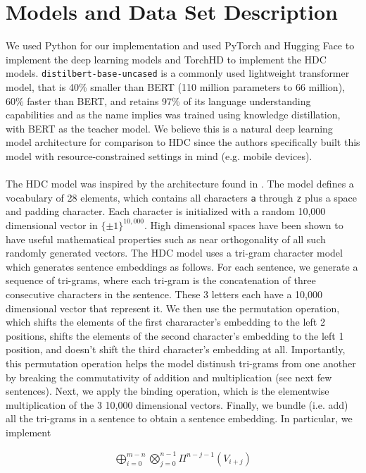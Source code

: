 \documentclass[conference]{IEEEtran}
\begin{document}
\section{Models and Data Set Description}
\label{sec:models}
We used Python for our implementation and used PyTorch and Hugging Face \cite{HF} to implement the deep learning models and TorchHD \cite{torchhd} to implement the HDC models. \verb|distilbert-base-uncased| is a commonly used lightweight transformer model, that is 40\% smaller than BERT (110 million parameters to  66 million), 60\% faster than BERT, and retains 97\% of its language understanding capabilities \cite{sanh2020distilbert} and as the name implies was trained using knowledge distillation, with BERT as the teacher model. We believe this is a natural deep learning model architecture for comparison to HDC since the authors specifically built this model with resource-constrained settings in mind (e.g. mobile devices).\\
\\
The HDC model was inspired by the architecture found in \cite{HDC}. The model defines a vocabulary of 28 elements, which contains all characters \verb|a| through \verb|z| plus a space and padding character. Each character is initialized with a random 10,000 dimensional vector in $\{\pm 1\}^{10,000}$. High dimensional spaces have been shown to have useful mathematical properties such as near orthogonality of all such randomly generated vectors. The HDC model uses a tri-gram character model which generates sentence embeddings as follows. For each sentence, we generate a sequence of tri-grams, where each tri-gram is the concatenation of three consecutive characters in the sentence. These 3 letters each have a 10,000 dimensional vector that represent it. We then use the permutation operation, which shifts the elements of the first chararacter's embedding to the left 2 positions, shifts the elements of the second character's embedding to the left 1 position, and doesn't shift the third character's embedding at all. Importantly, this permutation operation helps the model distinush tri-grams from one another by breaking the commutativity of addition and multiplication (see next few sentences). Next, we apply the binding operation, which is the elementwise multiplication of the 3 10,000 dimensional vectors. Finally, we bundle (i.e. add) all the tri-grams in a sentence to obtain a sentence embedding. In particular, we implement

\begin{align}
    \bigoplus_{i=0}^{m - n} \bigotimes_{j = 0}^{n - 1} \Pi^{n - j - 1}(V_{i + j}) \label{eq:embedding}
\end{align}
\end{document}

